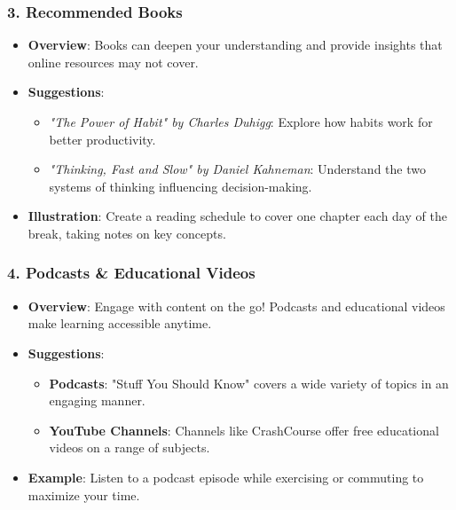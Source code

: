 \documentclass[aspectratio=169]{beamer}
\begin{document}
\begin{frame}[fragile]
    \frametitle{3. Recommended Books}
    \begin{itemize}
        \item \textbf{Overview}: Books can deepen your understanding and provide insights that online resources may not cover.
        \item \textbf{Suggestions}:
            \begin{itemize}
                \item \textit{"The Power of Habit" by Charles Duhigg}: Explore how habits work for better productivity.
                \item \textit{"Thinking, Fast and Slow" by Daniel Kahneman}: Understand the two systems of thinking influencing decision-making.
            \end{itemize}
        \item \textbf{Illustration}: Create a reading schedule to cover one chapter each day of the break, taking notes on key concepts.
    \end{itemize}
\end{frame}

\begin{frame}[fragile]
    \frametitle{4. Podcasts \& Educational Videos}
    \begin{itemize}
        \item \textbf{Overview}: Engage with content on the go! Podcasts and educational videos make learning accessible anytime.
        \item \textbf{Suggestions}:
            \begin{itemize}
                \item \textbf{Podcasts}: "Stuff You Should Know" covers a wide variety of topics in an engaging manner.
                \item \textbf{YouTube Channels}: Channels like CrashCourse offer free educational videos on a range of subjects.
            \end{itemize}
        \item \textbf{Example}: Listen to a podcast episode while exercising or commuting to maximize your time.
    \end{itemize}
\end{frame}
\end{document}
